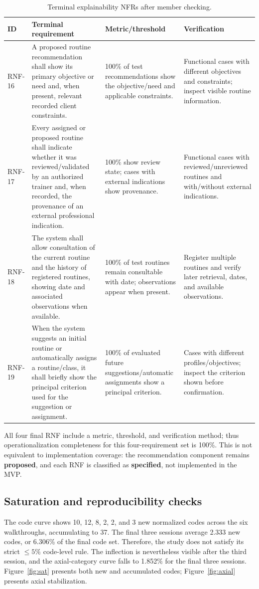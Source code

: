 \documentclass[pdflatex,sn-basic]{sn-jnl}
\begin{document}
\begin{table}[H]
\caption{Terminal explainability NFRs after member checking.}\label{tab:rnf}
\centering\small
\begin{tabularx}{\textwidth}{@{}p{1.5cm}X p{3.1cm}p{3.2cm}@{}}
\toprule
ID & Terminal requirement & Metric/threshold & Verification \\
\midrule
RNF-16 & A proposed routine recommendation shall show its primary objective or need and, when present, relevant recorded client constraints. & 100\% of test recommendations show the objective/need and applicable constraints. & Functional cases with different objectives and constraints; inspect visible routine information.\\
RNF-17 & Every assigned or proposed routine shall indicate whether it was reviewed/validated by an authorized trainer and, when recorded, the provenance of an external professional indication. & 100\% show review state; cases with external indications show provenance. & Functional cases with reviewed/unreviewed routines and with/without external indications.\\
RNF-18 & The system shall allow consultation of the current routine and the history of registered routines, showing date and associated observations when available. & 100\% of test routines remain consultable with date; observations appear when present. & Register multiple routines and verify later retrieval, dates, and available observations.\\
RNF-19 & When the system suggests an initial routine or automatically assigns a routine/class, it shall briefly show the principal criterion used for the suggestion or assignment. & 100\% of evaluated future suggestions/automatic assignments show a principal criterion. & Cases with different profiles/objectives; inspect the criterion shown before confirmation.\\
\bottomrule
\end{tabularx}
\end{table}

All four final RNF include a metric, threshold, and verification method; thus operationalization completeness for this four-requirement set is 100\%. This is not equivalent to implementation coverage: the recommendation component remains \textbf{proposed}, and each RNF is classified as \textbf{specified}, not implemented in the MVP.

\subsection{Saturation and reproducibility checks}
The code curve shows 10, 12, 8, 2, 2, and 3 new normalized codes across the six walkthroughs, accumulating to 37. The final three sessions average 2.333 new codes, or 6.306\% of the final code set. Therefore, the study does not satisfy its strict $\leq5\%$ code-level rule. The inflection is nevertheless visible after the third session, and the axial-category curve falls to 1.852\% for the final three sessions. Figure~\ref{fig:sat} presents both new and accumulated codes; Figure~\ref{fig:axial} presents axial stabilization.
\end{document}
